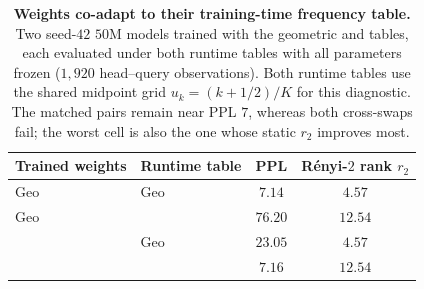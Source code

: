 \begin{table}[h]
\centering
\small
\setlength{\tabcolsep}{6pt}
\renewcommand{\arraystretch}{0.95}
\caption{\textbf{Weights co-adapt to their training-time frequency table.} Two
seed-$42$ $50$M models trained with the geometric and \evq{} tables, each
evaluated under both runtime tables with all parameters frozen ($1{,}920$
head--query observations). Both runtime tables use the shared midpoint grid
$u_k=(k+1/2)/K$ for this diagnostic. The matched pairs remain near PPL $7$, whereas both
cross-swaps fail; the worst cell is also the one whose static $r_2$ improves
most.}
\label{tab:coadapt}
\begin{tabular}{@{}llcc@{}}
\toprule
Trained weights & Runtime table & PPL & Rényi-$2$ rank $r_2$ \\
\midrule
Geo   & Geo   & $\mathbf{7.14}$ & $4.57$ \\
Geo   & \evq{} & $76.20$ & $\mathbf{12.54}$ \\
\evq{} & Geo   & $23.05$ & $4.57$ \\
\evq{} & \evq{} & $\mathbf{7.16}$ & $12.54$ \\
\bottomrule
\end{tabular}
\end{table}
